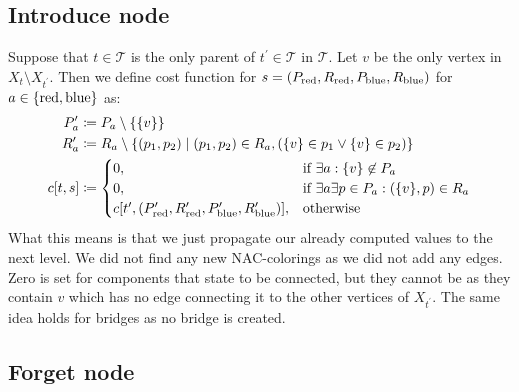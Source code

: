 \subsection{Introduce node}

Suppose that \( t \in \mathcal{T} \) is
the only parent of \( t^\prime \in \mathcal{T} \) in \( \mathcal {T} \).
Let \( v \) be the only vertex in \( X_t \setminus X_{t^\prime} \).
Then we define cost function for \( s=(P_{\text{red}}, R_{\text{red}}, P_{\text{blue}}, R_{\text{blue}}) \)
for \( a \in \{\text{red}, \text{blue}\} \) as:
%
\begin{align*}
	P_a^\prime & \coloneqq P_a \setminus \{\{v\}\}                                                                    \notag \\
	R_a^\prime & \coloneqq R_a \setminus \{ (p_1, p_2) \mid (p_1, p_2) \in R_a, (\{v\} \in p_1 \lor \{v\} \in p_2) \} \notag \\
	c[t, s]    & \coloneqq
	\begin{cases}
		0,                                                                           & \text{if } \exists a : \{v\} \not\in P_a                    \\
		0,                                                                           & \text{if } \exists a \exists p \in P_a : (\{v\}, p) \in R_a \\
		c[t^\prime, (P_{\text{red}}^\prime, R_{\text{red}}^\prime, P_{\text{blue}}^\prime, R_{\text{blue}}^\prime)], & \text{otherwise}
	\end{cases}
\end{align*}
%
What this means is that we just propagate our already computed values to the next level.
We did not find any new NAC-colorings as we did not add any edges.
Zero is set for components that state to be connected,
but they cannot be as they contain \( v \)
which has no edge connecting it to the other vertices of \( X_{t^\prime} \).
The same idea holds for bridges as no bridge is created.

\subsection{Forget node}


